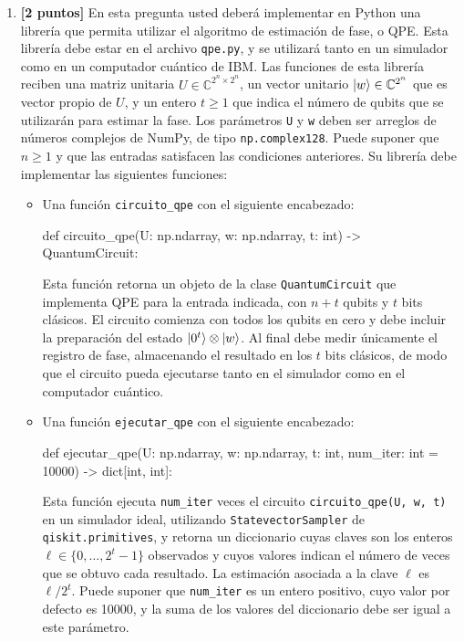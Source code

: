 \documentclass[10pt]{article}
\begin{document}
\begin{enumerate}
\item \textbf{[2 puntos]} En esta pregunta usted deberá implementar en Python una librería
  que permita utilizar el algoritmo de estimación de fase, o QPE. Esta librería debe estar
  en el archivo \texttt{qpe.py}, y se utilizará tanto en un simulador como en un computador
  cuántico de IBM. Las funciones de esta librería reciben una matriz unitaria
  $U\in\mathbb C^{2^n\times2^n}$, un vector unitario $\ket{w}\in\mathbb C^{2^n}$
  que es vector propio de $U$, y un entero $t\geq1$ que indica el número de qubits que se
  utilizarán para estimar la fase. Los parámetros \texttt{U} y \texttt{w} deben ser
  arreglos de números complejos de NumPy, de tipo \texttt{np.complex128}. Puede suponer que $n\geq1$ y que las entradas
  satisfacen las condiciones anteriores. Su librería debe implementar las siguientes funciones:

  \begin{itemize}
  \item Una función \texttt{circuito\_qpe} con el siguiente encabezado:
\begin{python}
def circuito_qpe(U: np.ndarray, w: np.ndarray, t: int) -> QuantumCircuit:
\end{python}
    Esta función retorna un objeto de la clase \texttt{QuantumCircuit} que implementa
    QPE para la entrada indicada, con $n+t$ qubits y $t$ bits clásicos. El circuito
    comienza con todos los qubits en cero y debe incluir la preparación del estado
    $\ket{0^t}\otimes\ket{w}$. Al final debe medir únicamente el registro de fase,
    almacenando el resultado en los $t$ bits clásicos, de modo que el circuito pueda
    ejecutarse tanto en el simulador como en el computador cuántico.

  \item Una función \texttt{ejecutar\_qpe} con el siguiente encabezado:
\begin{python}
def ejecutar_qpe(U: np.ndarray, w: np.ndarray, t: int,
                                num_iter: int = 10000) -> dict[int, int]:
\end{python}
    Esta función ejecuta \texttt{num\_iter} veces el circuito \texttt{circuito\_qpe(U, w, t)}
    en un simulador ideal, utilizando \texttt{StatevectorSampler} de \texttt{qiskit.primitives}, y retorna
    un diccionario cuyas claves son los enteros $\ell\in\{0,\ldots,2^t-1\}$ observados
    y cuyos valores indican el número de veces que se obtuvo cada resultado. La estimación
    asociada a la clave $\ell$ es $\ell/2^t$. Puede suponer que \texttt{num\_iter} es un
    entero positivo, cuyo valor por defecto es 10000, y la suma de los valores del
    diccionario debe ser igual a este parámetro.
  \end{itemize}


\end{enumerate}
\end{document}
